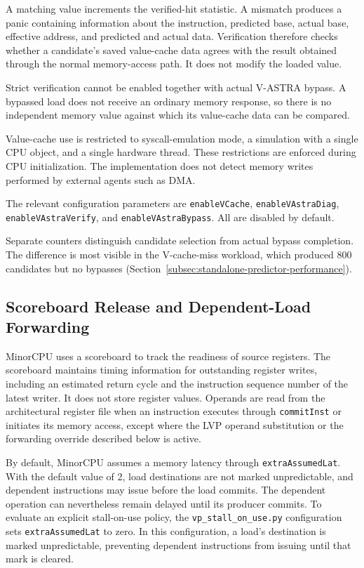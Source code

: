 A matching value increments the verified-hit statistic.
A mismatch produces a panic containing information about the
instruction, predicted base, actual base, effective address,
and predicted and actual data. Verification therefore checks
whether a candidate's saved value-cache data agrees with the result
obtained through the normal memory-access path. It does not
modify the loaded value.

Strict verification cannot be enabled together with actual
V-ASTRA bypass. A bypassed load does not receive an ordinary
memory response, so there is no independent memory value
against which its value-cache data can be compared.

Value-cache use is restricted to syscall-emulation mode, a simulation
with a single CPU object, and a single hardware thread.
These restrictions are enforced during CPU initialization.
The implementation does not detect memory writes performed
by external agents such as DMA.

The relevant configuration parameters are
\texttt{enable\allowbreak VCache},
\texttt{enable\allowbreak VAstra\allowbreak Diag},
\texttt{enable\allowbreak VAstra\allowbreak Verify}, and
\texttt{enable\allowbreak VAstra\allowbreak Bypass}. All are
disabled by default.

Separate counters distinguish candidate selection from actual bypass
completion. The difference is most visible in the V-cache-miss
workload, which produced 800 candidates but no bypasses
(Section~\ref{subsec:standalone-predictor-performance}).

\subsection{Scoreboard Release and Dependent-Load Forwarding}
\label{sec:impl-sb}

MinorCPU uses a scoreboard to track the readiness of source
registers. The scoreboard maintains timing information for
outstanding register writes, including an estimated return cycle
and the instruction sequence number of the latest writer. It
does not store register values. Operands are read from the
architectural register file when an instruction executes through
\texttt{commitInst} or initiates its memory access, except where
the LVP operand substitution or the forwarding override described
below is active.

By default, MinorCPU assumes a memory latency through
\texttt{extraAssumedLat}. With the default value of 2, load
destinations are not marked unpredictable, and dependent
instructions may issue before the load commits. The dependent
operation can nevertheless remain delayed until its producer
commits. To evaluate an explicit stall-on-use policy, the
\texttt{vp\_stall\_on\_use.py} configuration sets
\texttt{extraAssumedLat} to zero. In this configuration, a load's
destination is marked unpredictable, preventing dependent
instructions from issuing until that mark is cleared.

